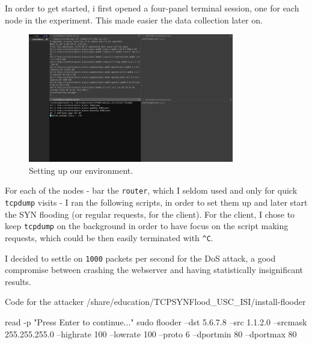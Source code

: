 \documentclass[a4paper,11pt,hidelinks]{article}
\begin{document}
In order to get started, i first opened a four-panel terminal session, one for each node in the experiment. This made easier the data collection later on.

\begin{figure}[h!]
  \centering
  \includegraphics[width=0.8\textwidth]{../drawable/setup.png}
  \caption{Setting up our environment.}
\end{figure}

For each of the nodes - bar the \verb=router=, which I seldom used and only for quick \verb=tcpdump= visits - I ran the following scripts, in order to set them up and later start the SYN flooding (or regular requests, for the client). For the client, I chose to keep \verb=tcpdump= on the background in order to have focus on the script making requests, which could be then easily terminated with \verb=^C=.

I decided to settle on \verb=1000= packets per second for the DoS attack, a good compromise between crashing the webserver and having statistically insignificant results.


\begin{code}{Code for the attacker}
  /share/education/TCPSYNFlood_USC_ISI/install-flooder

  read -p "Press Enter to continue..."
  sudo flooder --dst 5.6.7.8 --src 1.1.2.0
  --srcmask 255.255.255.0 --highrate 100
  --lowrate 100 --proto 6 --dportmin 80
  --dportmax 80
\end{code}
\end{document}
